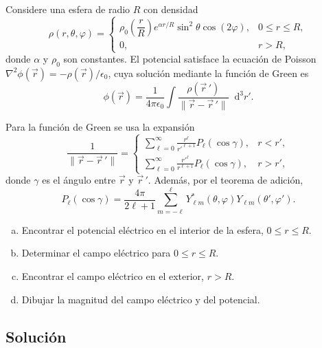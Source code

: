 \documentclass[a4paper]{article}
\newcommand{\dd}{\mathop{}\!\mathrm{d}}
\begin{document}
Considere una esfera de radio $R$ con densidad
\[
\rho(r,\theta,\varphi)=
\begin{cases}
\rho_0\left(\dfrac{r}{R}\right)e^{\alpha r/R}\sin^2\theta\cos(2\varphi), & 0\le r\le R,\\
0, & r>R,
\end{cases}
\]
donde $\alpha$ y $\rho_0$ son constantes. El potencial satisface la ecuación de Poisson
$\nabla^2\phi(\vec r)=-\rho(\vec r)/\epsilon_0$, cuya solución mediante la función de Green es
\begin{equation}
\label{eq:green-potential}
\phi(\vec r)=\frac{1}{4\pi\epsilon_0}\int \frac{\rho(\vec r\,')}{\lVert \vec r-\vec r\,'\rVert}\dd^3r'.
\end{equation}

Para la función de Green se usa la expansión
\[
\frac{1}{\lVert \vec r-\vec r\,'\rVert}
=\begin{cases}
\displaystyle \sum_{\ell=0}^{\infty}\frac{r^\ell}{r'^{\ell+1}}P_\ell(\cos\gamma), & r<r',\\[0.5em]
\displaystyle \sum_{\ell=0}^{\infty}\frac{r'^\ell}{r^{\ell+1}}P_\ell(\cos\gamma), & r>r',
\end{cases}
\]
donde $\gamma$ es el ángulo entre $\vec r$ y $\vec r\,'$. Además, por el teorema de adición,
\begin{equation}
\label{eq:addition-theorem}
P_\ell(\cos\gamma)=\frac{4\pi}{2\ell+1}\sum_{m=-\ell}^{\ell}
Y_{\ell m}^*(\theta,\varphi)Y_{\ell m}(\theta',\varphi').
\end{equation}

\begin{enumerate}[a)]
    \item Encontrar el potencial eléctrico en el interior de la esfera, $0\le r\le R$.
    \item Determinar el campo eléctrico para $0\le r\le R$.
    \item Encontrar el campo eléctrico en el exterior, $r>R$.
    \item Dibujar la magnitud del campo eléctrico y del potencial.
\end{enumerate}

\subsection{Solución}
\end{document}
